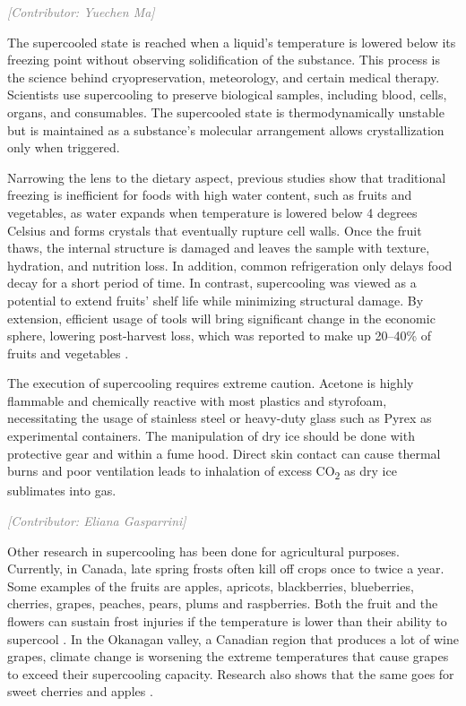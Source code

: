\documentclass[12pt, a4paper]{article}
\newcommand{\contributor}[1]{\vspace{4pt}\noindent\textcolor{gray}{\small\textit{[Contributor: #1]}}\vspace{2pt}}
\begin{document}
\contributor{Yuechen Ma}

The supercooled state is reached when a liquid's temperature is lowered
below its freezing point without observing solidification of the
substance. This process is the science behind cryopreservation,
meteorology, and certain medical therapy. Scientists use supercooling to
preserve biological samples, including blood, cells, organs, and
consumables. The supercooled state is thermodynamically unstable but is
maintained as a substance's molecular arrangement allows crystallization
only when triggered.

Narrowing the lens to the dietary aspect, previous studies show that
traditional freezing is inefficient for foods with high water content,
such as fruits and vegetables, as water expands when temperature is
lowered below 4 degrees Celsius and forms crystals that eventually
rupture cell walls. Once the fruit thaws, the internal structure is
damaged and leaves the sample with texture, hydration, and nutrition
loss. In addition, common refrigeration only delays food decay for a
short period of time. In contrast, supercooling was viewed as a
potential to extend fruits' shelf life while minimizing structural
damage. By extension, efficient usage of tools will bring significant
change in the economic sphere, lowering post-harvest loss, which was
reported to make up 20--40\% of fruits and vegetables \cite{fao1989}.

The execution of supercooling requires extreme caution. Acetone is
highly flammable and chemically reactive with most plastics and
styrofoam, necessitating the usage of stainless steel or heavy-duty
glass such as Pyrex as experimental containers. The manipulation of dry
ice should be done with protective gear and within a fume hood. Direct
skin contact can cause thermal burns and poor ventilation leads to
inhalation of excess CO\textsubscript{2} as dry ice sublimates into gas.

\contributor{Eliana Gasparrini}


Other research in supercooling has been done for agricultural purposes.
Currently, in Canada, late spring frosts often kill off crops once to
twice a year. Some examples of the fruits are apples, apricots,
blackberries, blueberries, cherries, grapes, peaches, pears, plums and
raspberries. Both the fruit and the flowers can sustain frost injuries
if the temperature is lower than their ability to supercool
\cite{palonen1997}. In the Okanagan valley, a Canadian region that
produces a lot of wine grapes, climate change is worsening the extreme
temperatures that cause grapes to exceed their supercooling capacity.
Research also shows that the same goes for sweet cherries and apples
\cite{quamme2010}.
\end{document}
